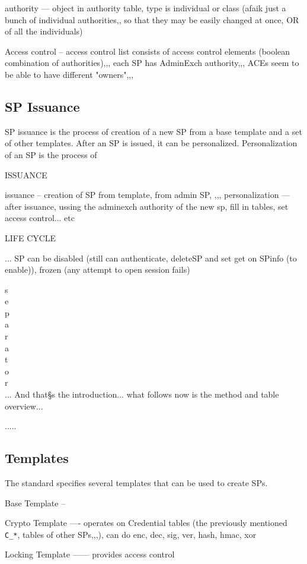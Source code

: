 \documentclass[
  digital, %
  oneside, %
  nolof,     %
  nolot,     %
]{fithesis4}
\begin{document}
authority --- object in authority table, type is individual or class (afaik just a bunch of individual authorities,, so that they may be easily changed at once, OR of all the individuals)

Access control -- access control list consists of access control elements (boolean combination of authorities),,,
each SP has AdminExch authority,,, 
ACEs seem to be able to have different "owners",,,

\hline

\subsection{SP Issuance}

SP issuance is the process of creation of a new SP from a base template and a set of other templates. After an SP is issued, it can be personalized. Personalization of an SP is the process of 

\hline

ISSUANCE

issuance -- creation of SP from template, from admin SP, ,,,
personalization --- after issuance, ussing the adminexch authority of the new sp, fill in tables, set access control... etc

LIFE CYCLE

... SP can be disabled (still can authenticate, deleteSP and set get on SPinfo (to enable)), frozen (any attempt to open session fails)


s \\
e \\
p \\
a \\
r \\
a \\
t \\
o \\
r \\

... And that§s the introduction... what follows now is the method and table overview...


.....

\hline

\subsection{Templates}

The standard specifies several templates that can be used to create SPs.

\hline

Base Template --

Crypto Template ---- operates on Credential tables (the previously mentioned \verb|C_*|, tables of other SPs,,,), can do enc, dec, sig, ver, hash, hmac, xor

Locking Template ------ provides access control



\printbibliography[heading=bibintoc] %
\end{document}
